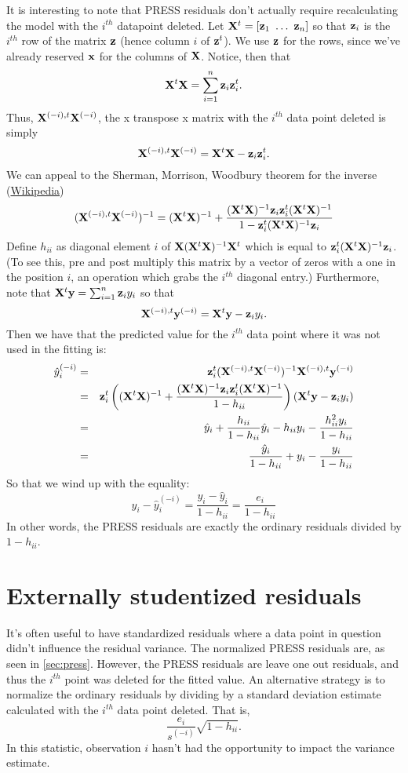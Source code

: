 It is interesting to note that PRESS residuals don't actually require recalculating the
model with the $i^{th}$ datapoint deleted. Let $\mathbf{X}^t = [\mathbf{z}_1 ~ \ldots ~ \mathbf{z}_n]$
so that $\mathbf{z}_i$ is the $i^{th}$ row of the matrix $\mathbf{z}$ (hence column $i$ of $\mathbf{z}^t$). 
We use $\mathbf{z}$ for the rows, since we've already reserved $\mathbf{x}$ for the columns of $\mathbf{X}$. 
Notice, then that 
$$
\mathbf{X}^t \mathbf{X} = \sum_{i=1}^n \mathbf{z}_i \mathbf{z}_i^t.
$$
Thus, $\mathbf{X}^{(-i), t} \mathbf{X}^{(-i)}$, the x transpose x matrix with the $i^{th}$ data
point deleted is simply
$$
\mathbf{X}^{(-i), t} \mathbf{X}^{(-i)} = \mathbf{X}^t \mathbf{X} - \mathbf{z}_i \mathbf{z}_i^t.
$$
We can appeal to the Sherman, Morrison, Woodbury theorem for the inverse
(\href{https://en.wikipedia.org/wiki/Sherman%E2%80%93Morrison_formula}{Wikipedia})
$$
(\mathbf{X}^{(-i), t} \mathbf{X}^{(-i)})^{-1}
= (\mathbf{X}^t \mathbf{X})^{-1} + \frac{(\mathbf{X}^t \mathbf{X})^{-1} \mathbf{z}_i \mathbf{z}_i^t (\mathbf{X}^t \mathbf{X})^{-1}}{1 - \mathbf{z}_i^t (\mathbf{X}^t \mathbf{X})^{-1} \mathbf{z}_i}
$$
Define $h_{ii}$ as diagonal element $i$ of $\mathbf{X} (\mathbf{X}^t \mathbf{X})^{-1} \mathbf{X}^t$ which is equal to
$\mathbf{z}_i^t (\mathbf{X}^t \mathbf{X})^{-1} \mathbf{z}_i$. (To see this, pre and post multiply this matrix by a 
vector of zeros with a one in the position $i$, an operation which grabs the $i^{th}$ diagonal entry.)
Furthermore, note that $\mathbf{X}^t \mathbf{y} = \sum_{i=1}^n \mathbf{z}_i y_i$ so that
$$
\mathbf{X}^{(-i),t} \mathbf{y}^{(-i)} = \mathbf{X}^t \mathbf{y} - \mathbf{z}_i y_i.
$$
Then we have that the predicted value for the $i^{th}$ data point where it was not used in the fitting is:
\begin{eqnarray*}
\hat y^{(-i)}_i & = & \mathbf{z}_i^t (\mathbf{X}^{(-i), t} \mathbf{X}^{(-i)})^{-1} \mathbf{X}^{(-i),t} \mathbf{y}^{(-i)}\\
& = & \mathbf{z}_i^t \left((\mathbf{X}^t \mathbf{X})^{-1} + \frac{(\mathbf{X}^t \mathbf{X})^{-1} \mathbf{z}_i \mathbf{z}_i^t (\mathbf{X}^t \mathbf{X})^{-1}}{1 - h_{ii}} \right)(\mathbf{X}^t \mathbf{y} - \mathbf{z}_i y_i) \\
& = & \hat y_i + \frac{h_{ii}}{1 - h_{ii}} \hat y_i - h_{ii} y_i - \frac{h_{ii}^2 y_i}{1 - h_{ii}} \\
& = & \frac{\hat y_i}{1 - h_{ii}} + y_i - \frac{y_i}{1 - h_{ii}}
\end{eqnarray*}
So that we wind up with the equality: 
$$
y_i - \hat y^{(-i)}_i = \frac{y_i - \hat y_i}{1 - h_{ii}} = \frac{e_i}{1 - h_{ii}}
$$
In other words, the PRESS residuals are exactly the ordinary residuals divided by $1 - h_{ii}$. 

\section{Externally studentized residuals}
It's often useful to have standardized residuals where a data point in question didn't
influence the residual variance. The normalized
PRESS residuals are, as seen in \ref{sec:press}.  However, the PRESS residuals are 
leave one out residuals, and thus the $i^{th}$ point was deleted for the fitted value. An alternative
strategy is to normalize the ordinary residuals by dividing by a standard deviation estimate
calculated with the $i^{th}$ data point deleted. That is,
$$
\frac{e_i}{s^{(-i)}}\sqrt{1 - h_{ii}}.
$$
In this statistic, observation $i$ hasn't had the opportunity to impact the variance estimate.
